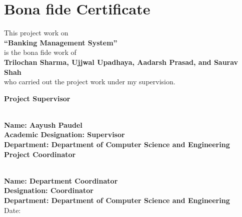 \chapter*{Bona fide Certificate}
\begin{center}

\vspace{1cm}

This project work on\\[0.3cm]
\textbf{``Banking Management System''}\\[0.6cm]
is the bona fide work of\\[0.3cm]
\textbf{Trilochan Sharma, Ujjwal Upadhaya, Aadarsh Prasad, and Saurav Shah}\\[0.6cm]
who carried out the project work under my supervision.

\vspace{3cm}

\end{center}

\noindent
\textbf{Project Supervisor}

\vspace{1.5cm}

\noindent
\makebox[6cm]{\hrulefill}\\
\textbf{Name: Aayush Paudel}\\
\textbf{Academic Designation: Supervisor}\\
\textbf{Department: Department of Computer Science and Engineering}\\[0.8cm]

\noindent
\textbf{Project Coordinator}

\vspace{0.6cm}

\noindent
\makebox[6cm]{\hrulefill}\\
\textbf{Name: Department Coordinator}\\
\textbf{Designation: Coordinator}\\
\textbf{Department: Department of Computer Science and Engineering}\\[0.8cm]

\noindent
Date:\ \underline{\hspace{4cm}}
